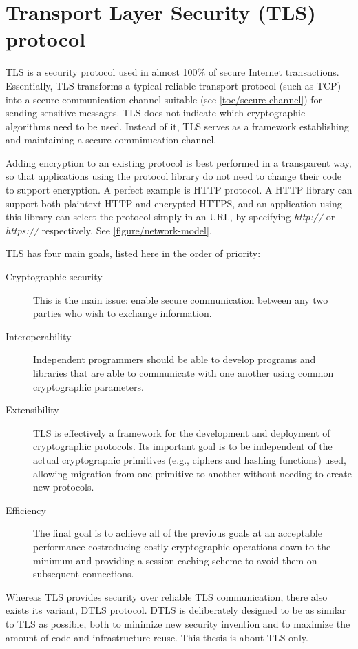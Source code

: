 \chapter{Transport Layer Security (TLS) protocol}



TLS is a security protocol used in almost 100\% of secure Internet transactions. Essentially, TLS transforms a typical reliable transport protocol (such as TCP) into a secure communication channel suitable (see \autoref{toc/secure-channel}) for sending sensitive messages. TLS does not indicate which cryptographic algorithms need to be used. Instead of it, TLS serves as a framework establishing and maintaining a secure comminucation channel.

Adding encryption to an existing protocol is best performed in a transparent way, so that applications using the protocol library do not need to change their code to support encryption. A perfect example is HTTP protocol. A HTTP library can support both plaintext HTTP and encrypted HTTPS, and an application using this library can select the protocol simply in an URL, by specifying \textit{http://} or \textit{https://} respectively. See \autoref{figure/network-model}.

TLS has four main goals, listed here in the order of priority:

\begin{description}
  \item[Cryptographic security] This is the main issue: enable secure communication between any two parties who wish to exchange information.
  \item[Interoperability] Independent programmers should be able to develop programs and libraries that are able to communicate with one another using common cryptographic parameters.
  \item[Extensibility] TLS is effectively a framework for the development and deployment of cryptographic protocols. Its important goal is to be independent of the actual cryptographic primitives (e.g., ciphers and hashing functions) used, allowing migration from one primitive to another without needing to create new protocols.
  \item[Efficiency] The final goal is to achieve all of the previous goals at an acceptable performance costreducing costly cryptographic operations down to the minimum and providing a session caching scheme to avoid them on subsequent connections. \cite{ristic2014bulletproof}
\end{description}

Whereas TLS provides security over reliable TLS communication, there also exists its variant, DTLS protocol. DTLS is deliberately designed to be as similar to TLS as possible, both to minimize new security invention and to maximize the amount of code and infrastructure reuse. \cite{rfc6347} This thesis is about TLS only.





